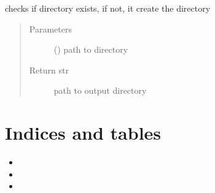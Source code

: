 \documentclass[letterpaper,10pt,english]{sphinxmanual}
\begin{document}
\begin{fulllineitems}
\begin{fulllineitems}
\begin{quote}
\begin{description}
\end{description}\end{quote}

\end{fulllineitems}


\begin{fulllineitems}
\label{\detokenize{hs_utilities_api:hotspots.hs_utilities.Helper.get_out_dir}}
checks if directory exists, if not, it create the directory
\begin{quote}\begin{description}
\item[{Parameters}] \leavevmode
{} () \textendash{} path to directory

\item[{Return str}] \leavevmode
path to output directory

\end{description}\end{quote}

\end{fulllineitems}


\end{fulllineitems}



\chapter{Indices and tables}
\label{\detokenize{index:indices-and-tables}}\begin{itemize}
\item {} 

\item {} 

\item {} 

\end{itemize}
\end{document}
